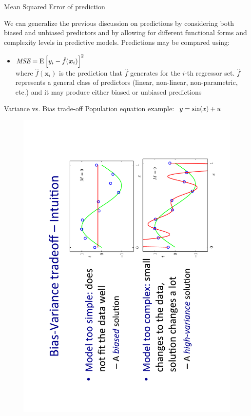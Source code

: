 \documentclass{beamer}
\begin{document}
\begin{frame}{Mean Squared Error of prediction}

We can generalize the previous discussion on predictions by considering both biased and unbiased predictors and by allowing for different functional forms and complexity levels in predictive models. Predictions may be compared using:

\medskip
\begin{itemize}
   \item $\textit{MSE} = \textnormal{E}
   \left[y_i - \hat{f}(\bm{x}_i) \right]^2$\\
   \smallskip
   where $\hat{f}(\bm{x}_i)$ is the prediction that $\hat{f}$ generates for the $i$-th regressor set. $\hat{f}$ represents a general class of predictors (linear, non-linear, non-parametric, etc.) and it may produce either biased or unbiased predictions
\end{itemize}
\end{frame}
\begin{frame}{Variance vs. Bias trade-off}
Population equation example: $~y = \textnormal{sin}(x)+u$
\vspace{-1 cm}
\begin{figure}
\includegraphics[angle=270,scale=0.35]{img/VarBias.pdf}
\end{figure}
\end{frame}
\end{document}

